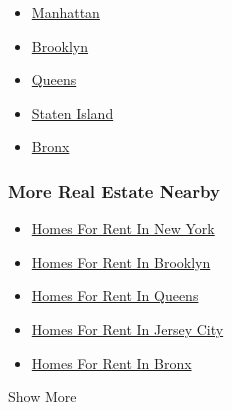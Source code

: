 \begin{itemize}
\tightlist
\item
  \href{/real-estate/usa/ny/new-yorknew-york-ny-usa/homes-for-rent}{Manhattan}
\item
  \href{/real-estate/usa/ny/brooklynbrooklyn-ny-usa/homes-for-rent}{Brooklyn}
\item
  \href{/real-estate/usa/ny/queensqueens-ny-usa/homes-for-rent}{Queens}
\item
  \href{/real-estate/usa/ny/staten-islandstaten-island-ny-usa/homes-for-rent}{Staten
  Island}
\item
  \href{/real-estate/usa/ny/bronxbronx-ny-usa/homes-for-rent}{Bronx}
\end{itemize}

\hypertarget{more-real-estate-nearby}{%
\subsubsection{More Real Estate Nearby}\label{more-real-estate-nearby}}

\begin{itemize}
\tightlist
\item
  \href{/real-estate/usa/ny/new-yorknew-york-ny-usa/homes-for-rent}{Homes
  For Rent In New York}
\item
  \href{/real-estate/usa/ny/brooklynbrooklyn-ny-usa/homes-for-rent}{Homes
  For Rent In Brooklyn}
\item
  \href{/real-estate/usa/ny/queensqueens-ny-usa/homes-for-rent}{Homes
  For Rent In Queens}
\item
  \href{/real-estate/usa/nj/jersey-cityjersey-city-nj-usa/homes-for-rent}{Homes
  For Rent In Jersey City}
\item
  \href{/real-estate/usa/ny/bronxbronx-ny-usa/homes-for-rent}{Homes For
  Rent In Bronx}
\end{itemize}

Show More

